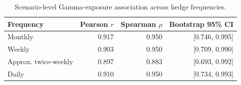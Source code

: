 \begin{table}[H]
\centering
\caption{Scenario-level Gamma-exposure association across hedge frequencies.}
\label{tab:gamma_robustness}
\begin{tabular}{lrrr}
\toprule
Frequency & Pearson $r$ & Spearman $\rho$ & Bootstrap 95\% CI \\
\midrule
Monthly & 0.917 & 0.950 & [0.746, 0.995] \\
Weekly & 0.903 & 0.950 & [0.709, 0.990] \\
Approx. twice-weekly & 0.897 & 0.883 & [0.693, 0.992] \\
Daily & 0.910 & 0.950 & [0.734, 0.993] \\
\bottomrule
\end{tabular}
\end{table}
